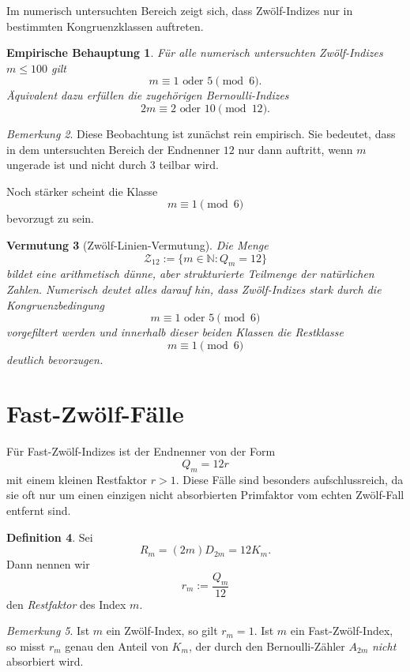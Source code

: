 \documentclass[11pt,a4paper]{article}
\theoremstyle{definition}
\newtheorem{definition}{Definition}[section]
\theoremstyle{plain}
\newtheorem{vermutung}[definition]{Vermutung}
\newtheorem{empirischebehauptung}[definition]{Empirische Behauptung}
\theoremstyle{remark}
\newtheorem{bemerkung}[definition]{Bemerkung}
\begin{document}
	Im numerisch untersuchten Bereich zeigt sich, dass Zwölf-Indizes nur in bestimmten Kongruenzklassen auftreten.
	
	\begin{empirischebehauptung}
		Für alle numerisch untersuchten Zwölf-Indizes $m\le 100$ gilt
		\[
		m\equiv 1 \text{ oder } 5 \pmod 6.
		\]
		Äquivalent dazu erfüllen die zugehörigen Bernoulli-Indizes
		\[
		2m\equiv 2 \text{ oder } 10 \pmod{12}.
		\]
	\end{empirischebehauptung}
	
	\begin{bemerkung}
		Diese Beobachtung ist zunächst rein empirisch. Sie bedeutet, dass in dem untersuchten Bereich der Endnenner $12$ nur dann auftritt, wenn $m$ ungerade ist und nicht durch $3$ teilbar wird.
	\end{bemerkung}
	
	Noch stärker scheint die Klasse
	\[
	m\equiv 1 \pmod 6
	\]
	bevorzugt zu sein.
	
	\begin{vermutung}[Zwölf-Linien-Vermutung]
		Die Menge
		\[
		\mathcal{Z}_{12}:=\{m\in\mathbb{N}: Q_m=12\}
		\]
		bildet eine arithmetisch dünne, aber strukturierte Teilmenge der natürlichen Zahlen. Numerisch deutet alles darauf hin, dass Zwölf-Indizes stark durch die Kongruenzbedingung
		\[
		m\equiv 1 \text{ oder } 5 \pmod 6
		\]
		vorgefiltert werden und innerhalb dieser beiden Klassen die Restklasse
		\[
		m\equiv 1 \pmod 6
		\]
		deutlich bevorzugen.
	\end{vermutung}
	
	\section{Fast-Zwölf-Fälle}
	
	Für Fast-Zwölf-Indizes ist der Endnenner von der Form
	\[
	Q_m=12r
	\]
	mit einem kleinen Restfaktor $r>1$. Diese Fälle sind besonders aufschlussreich, da sie oft nur um einen einzigen nicht absorbierten Primfaktor vom echten Zwölf-Fall entfernt sind.
	
	\begin{definition}
		Sei
		\[
		R_m=(2m)D_{2m}=12K_m.
		\]
		Dann nennen wir
		\[
		r_m:=\frac{Q_m}{12}
		\]
		den \emph{Restfaktor} des Index $m$.
	\end{definition}
	
	\begin{bemerkung}
		Ist $m$ ein Zwölf-Index, so gilt $r_m=1$. Ist $m$ ein Fast-Zwölf-Index, so misst $r_m$ genau den Anteil von $K_m$, der durch den Bernoulli-Zähler $A_{2m}$ \emph{nicht} absorbiert wird.
	\end{bemerkung}
	
\end{document}
